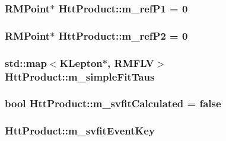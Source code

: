 \label{classHttProduct_a059310143e55e578c6f0ec5613e79ca6}
\hypertarget{classHttProduct_a485baa2ac1d1ecbdb55366c9865d27fe}{
\subsubsection[{m\_\-refP1}]{\setlength{\rightskip}{0pt plus 5cm}RMPoint$\ast$ {\bf HttProduct::m\_\-refP1} = 0}}
\label{classHttProduct_a485baa2ac1d1ecbdb55366c9865d27fe}
\hypertarget{classHttProduct_adc963cf8394312ce7d86c8ae53f0c6cd}{
\subsubsection[{m\_\-refP2}]{\setlength{\rightskip}{0pt plus 5cm}RMPoint$\ast$ {\bf HttProduct::m\_\-refP2} = 0}}
\label{classHttProduct_adc963cf8394312ce7d86c8ae53f0c6cd}
\hypertarget{classHttProduct_a169a364722b7ef30ef64c0cc9ab41047}{
\subsubsection[{m\_\-simpleFitTaus}]{\setlength{\rightskip}{0pt plus 5cm}std::map$<$KLepton$\ast$, RMFLV$>$ {\bf HttProduct::m\_\-simpleFitTaus}}}
\label{classHttProduct_a169a364722b7ef30ef64c0cc9ab41047}
\hypertarget{classHttProduct_accdce5615fc40068d8411be69b349f1c}{
\subsubsection[{m\_\-svfitCalculated}]{\setlength{\rightskip}{0pt plus 5cm}bool {\bf HttProduct::m\_\-svfitCalculated} = false}}
\label{classHttProduct_accdce5615fc40068d8411be69b349f1c}
\hypertarget{classHttProduct_a417c202e5be95c4971c52d7f51e92fd5}{
\subsubsection[{m\_\-svfitEventKey}]{ {\bf HttProduct::m\_\-svfitEventKey}}}
